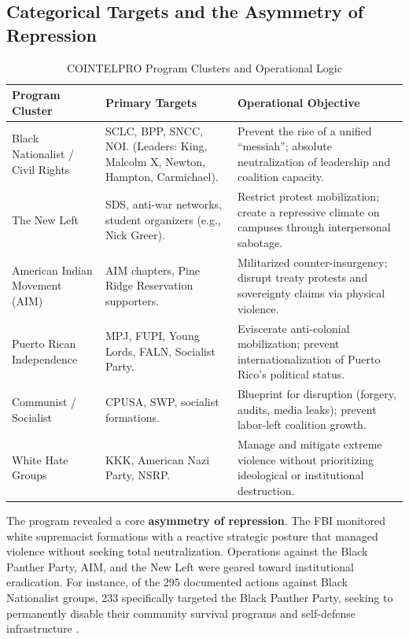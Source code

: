 \subsection{Categorical Targets and the Asymmetry of Repression}
\begin{table}[htbp]
\centering
\small
\caption{COINTELPRO Program Clusters and Operational Logic}
\label{tab:cointelpro_clusters}
\begin{tabular}{>{\raggedright}p{2.5cm} >{\raggedright}p{4.5cm} >{\raggedright\arraybackslash}p{7cm}}
\toprule
\textbf{Program Cluster} & \textbf{Primary Targets} & \textbf{Operational Objective} \\
\midrule
Black Nationalist / Civil Rights & SCLC, BPP, SNCC, NOI. (Leaders: King, Malcolm X, Newton, Hampton, Carmichael). & Prevent the rise of a unified ``messiah''; absolute neutralization of leadership and coalition capacity. \\
The New Left & SDS, anti-war networks, student organizers (e.g., Nick Greer). & Restrict protest mobilization; create a repressive climate on campuses through interpersonal sabotage. \\
American Indian Movement (AIM) & AIM chapters, Pine Ridge Reservation supporters. & Militarized counter-insurgency; disrupt treaty protests and sovereignty claims via physical violence. \\
Puerto Rican Independence & MPJ, FUPI, Young Lords, FALN, Socialist Party. & Eviscerate anti-colonial mobilization; prevent internationalization of Puerto Rico's political status. \\
Communist / Socialist & CPUSA, SWP, socialist formations. & Blueprint for disruption (forgery, audits, media leaks); prevent labor-left coalition growth. \\
White Hate Groups & KKK, American Nazi Party, NSRP. & Manage and mitigate extreme violence without prioritizing ideological or institutional destruction. \\
\bottomrule
\end{tabular}
\end{table}

The program revealed a core \textbf{asymmetry of repression}. The FBI monitored white supremacist formations with a reactive strategic posture that managed violence without seeking total neutralization. Operations against the Black Panther Party, AIM, and the New Left were geared toward institutional eradication. For instance, of the 295 documented actions against Black Nationalist groups, 233 specifically targeted the Black Panther Party, seeking to permanently disable their community survival programs and self-defense infrastructure \cite{fbi_cointelpro_vault}.

